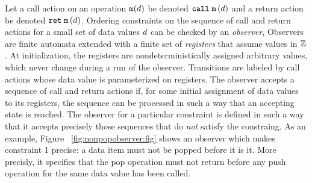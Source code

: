 Let a call action on an operation ${\tt m}(d)$ be denoted
$\mathtt{call}\; {\tt m}\left(d\right)$ and a return action be denoted
$\mathtt{ret}\; {\tt m}\left(d\right)$. Ordering constraints on the sequence of
call and return actions for a small set of data values $d$ can be
checked by an {\em observer},
%
Observers are
finite automata extended with a finite set of {\em registers}
that assume values in ${\mathbb Z}$. 
%
At initialization,
the registers are nondeterministically
assigned arbitrary values, which never change
during a run of the observer. 
%
Transitions are labeled by call actions whose data value
is parameterized on registers.%
%
The observer accepts a sequence of call and return actions
if, for some initial assignment of data values to its registers, the sequence
can  be processed in such a way that an accepting state is reached.
The observer for a particular constraint is defined in such a way that it
accepts precisely those sequences  that do {\em not} satisfy the constraing.
As an example, Figure ~\ref{fig:nonpopobserver:fig} shows an observer which
makes constraint 1 precise:
a data item must not be popped before it is it. More precisly, it
specifies that the pop operation must not return before any push operation
for the same data value has been called.

